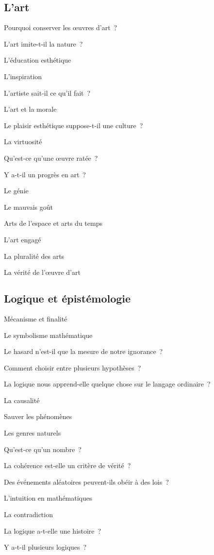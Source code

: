 \documentclass[a4paper]{article}
\begin{document}
\subsection{L'art}
\label{sec-6-1}


Pourquoi conserver les œuvres d'art ?

L'art imite-t-il la nature ?

L'éducation esthétique

L'inspiration

L'artiste sait-il ce qu'il fait ?

L'art et la morale

Le plaisir esthétique suppose-t-il une culture ?

La virtuosité

Qu'est-ce qu'une œuvre ratée ?

Y a-t-il un progrès en art ?

Le génie

Le mauvais goût

Arts de l'espace et arts du temps

L'art engagé

La pluralité des arts

La vérité de l'œuvre d'art
\subsection{Logique et épistémologie}
\label{sec-6-2}


Mécanisme et finalité

Le symbolisme mathématique

Le hasard n'est-il que la mesure de notre ignorance ?

Comment choisir entre plusieurs hypothèses ?

La logique nous apprend-elle quelque chose sur le langage ordinaire ?

La causalité

Sauver les phénomènes

Les genres naturels

Qu'est-ce qu'un nombre ?

La cohérence est-elle un critère de vérité ?

Des événements aléatoires peuvent-ils obéir à des lois ?

L'intuition en mathématiques

La contradiction

La logique a-t-elle une histoire ?

Y a-t-il plusieurs logiques ?
\end{document}
